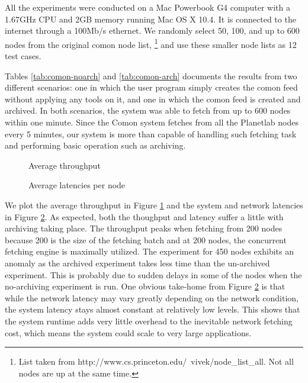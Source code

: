 All the experiments were conducted on a Mac Powerbook G4 computer
with a 1.67GHz CPU and 2GB memory running Mac OS X 10.4. It is
connected to the internet through a 100Mb/s ethernet. 
We randomly select 50, 100, and up to 600 nodes from the 
original comon node list, 
\footnote{List taken from http://www.cs.princeton.edu/~vivek/node\_list\_all. 
Not all nodes are up at the same time.}
and use these smaller node lists as 12 test cases. 

Tables \ref{tab:comon-noarch} and \ref{tab:comon-arch}
documents the results from two different scenarios:
one in which the user program simply creates the comon feed without applying
any tools on it, and one in which the comon feed is created
and archived. In both scenarios, the system was
able to fetch from up to 600 nodes within one minute.
Since the Comon system fetches from all the Planetlab nodes every
5 minutes, our system is more than capable of handling such fetching
task and performing basic operation such as archiving.

\begin{figure}[th]
\begin{center}
\caption{Average throughput}
\label{fig:throughput}
\end{center}
\end{figure}

\begin{figure}[th]
\begin{center}
\caption{Average latencies per node}
\label{fig:latency}
\end{center}
\end{figure}

We plot the average throughput in Figure \ref{fig:throughput}
and the system and network latencies in Figure \ref{fig:latency}. 
As expected, both the thoughput and latency suffer a little with 
archiving taking place. The throughput peaks when fetching from
200 nodes because 200 is the size of the fetching batch and
at 200 nodes, the concurrent fetching engine is maximally utilized.
The experiment for 450 nodes exhibits an anomaly as the archived
experiment takes less time than the un-archived experiment.
This is probably due to sudden delays in some of the nodes when the
no-archiving experiment is run. One obvious take-home from
Figure \ref{fig:latency} is that while the network latency may
vary greatly depending on the network condition, the system latency
stays almost constant at relatively low levels. This shows that
the \padsd{} system runtime adds very little overhead to the 
inevitable network fetching cost, which means the system could scale to
very large applications. 

